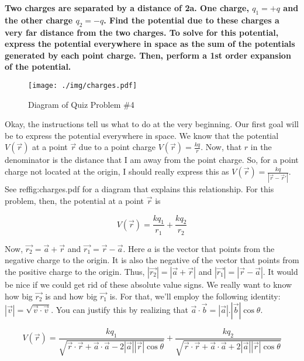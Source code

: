 \begin{homeworkProblem}[Quiz 4]
    \textbf{Two charges are separated by a distance of 2a. One charge,
    $q_1 = +q$ and the other charge $q_2 = -q$. Find the potential due
    to these charges a very far distance from the two charges. To solve
    for this potential, express the potential everywhere in space as the
    sum of the potentials generated by each point charge. Then, perform
    a 1st order expansion of the potential.}
    \\

    \begin{figure}[t]
        \centering
        \texttt{[image: ./img/charges.pdf]}
        \caption{Diagram of Quiz Problem \#4}
        \label{fig:charges.pdf}
    \end{figure}

    Okay, the instructions tell us what to do at the very beginning. Our
    first goal will be to express the potential everywhere in space. We
    know that the potential $V(\vec{r})$ at a point $\vec{r}$ due to a
    point charge $V(\vec{r}) = \frac{k q}{r} $. Now, that $r$ in the
    denominator is the distance that I am away from the point charge.
    So, for a point charge not located at the origin, I should really
    express this as $V(\vec{r}) = \frac{kq}{|\vec{r}-\vec{r}'|}$. See
    ref{fig:charges.pdf} for a diagram that explains this relationship.
    For this problem, then, the potential at a point $\vec{r}$ is

    \[
    V(\vec{r}) = \frac{k q_1}{r_1} + \frac{k q_2}{r_2}
    \]

    Now, $\vec{r_2}=\vec{a}+\vec{r}$ and $\vec{r_1}=\vec{r}-\vec{a}$.
    Here $a$ is the vector that points from the negative charge to the
    origin. It is also the negative of the vector that points from the
    positive charge to the origin. Thus, $|\vec{r_2}|=|\vec{a}+\vec{r}|$
    and $|\vec{r_1}| = |\vec{r}-\vec{a}|$. It would be nice if we could
    get rid of these absolute value signs. We really want to know how
    big $\vec{r_2}$ is and how big $\vec{r_1}$ is. For that, we'll
    employ the following identity: $|\vec{v}|=
    \sqrt{\vec{v}\cdot\vec{v}}$. You can justify this by realizing that
    $\vec{a}\cdot\vec{b}=|\vec{a}|.  |\vec{b}|\cos\theta$.

    \[
    V(\vec{r}) = \frac{k
    q_1}{\sqrt{\vec{r}\cdot\vec{r}+\vec{a}\cdot\vec{a}-2|\vec{a}||\vec{r}|\cos\theta}}
    + \frac{k
    q_2}{\sqrt{\vec{r}\cdot\vec{r}+\vec{a}\cdot\vec{a}+2|\vec{a}||\vec{r}|\cos\theta}}
    \]


\end{homeworkProblem}
